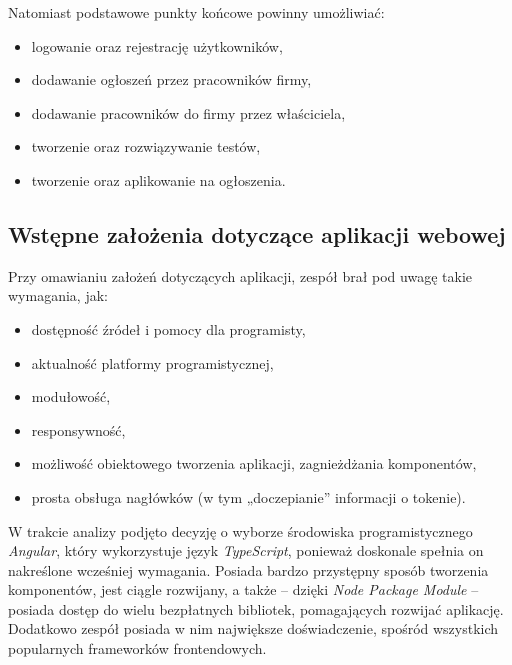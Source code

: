 \documentclass[twoside]{projektInzynierskiMS}
\numberwithin{figure}{section}
\begin{document}
Natomiast podstawowe punkty końcowe powinny umożliwiać:
\begin{itemize}
    \item logowanie oraz rejestrację użytkowników,
    \item dodawanie ogłoszeń przez pracowników firmy,
    \item dodawanie pracowników do firmy przez właściciela,
    \item tworzenie oraz rozwiązywanie testów,
    \item tworzenie oraz aplikowanie na ogłoszenia.
\end{itemize}

\subsection{Wstępne założenia dotyczące aplikacji webowej}
Przy omawianiu założeń dotyczących aplikacji, zespół brał pod uwagę takie wymagania, jak:
\begin{itemize}
    \item dostępność źródeł i pomocy dla programisty,
    \item aktualność platformy programistycznej,
    \item modułowość,
    \item responsywność,
    \item możliwość obiektowego tworzenia aplikacji, zagnieżdżania komponentów,
    \item prosta obsługa nagłówków (w tym „doczepianie” informacji o tokenie).
\end{itemize}

W trakcie analizy podjęto decyzję o wyborze środowiska programistycznego \textit{Angular}, który wykorzystuje język \textit{TypeScript}, ponieważ doskonale spełnia on nakreślone wcześniej wymagania. Posiada bardzo przystępny sposób tworzenia komponentów, jest ciągle rozwijany, a także -- dzięki \textit{Node Package Module} -- posiada dostęp do wielu bezpłatnych bibliotek, pomagających rozwijać aplikację. Dodatkowo zespół posiada w nim największe doświadczenie, spośród wszystkich popularnych frameworków frontendowych.
\end{document}
